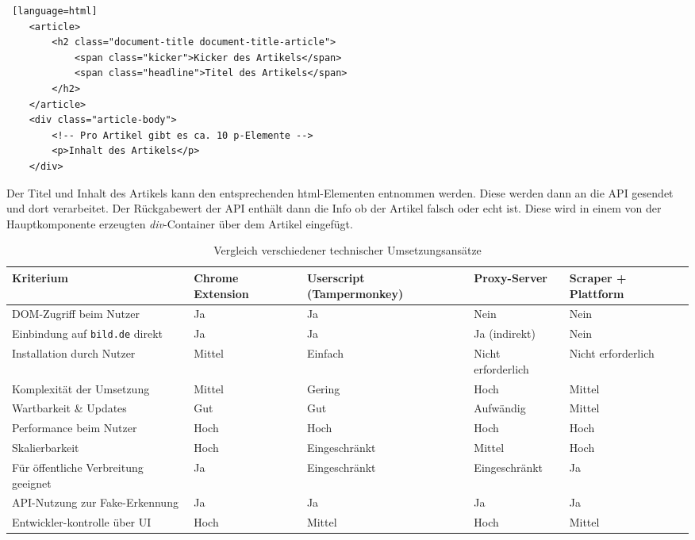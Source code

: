 \begin{lstlisting} [language=html]
    <article>
        <h2 class="document-title document-title-article">
            <span class="kicker">Kicker des Artikels</span>
            <span class="headline">Titel des Artikels</span>
        </h2>
    </article>
    <div class="article-body">
        <!-- Pro Artikel gibt es ca. 10 p-Elemente -->
        <p>Inhalt des Artikels</p>
    </div>
\end{lstlisting}

Der Titel und Inhalt des Artikels kann den entsprechenden html-Elementen entnommen werden.
Diese werden dann an die API gesendet und dort verarbeitet. 
Der Rückgabewert der API enthält dann die Info ob der Artikel falsch oder echt ist.
Diese wird in einem von der Hauptkomponente erzeugten \textit{div}-Container über dem Artikel eingefügt.

\begin{table}[ht]
    \centering
    \renewcommand{\arraystretch}{1.3}
    \begin{tabular}{|p{2.5cm}|p{2.5cm}|p{2.5cm}|p{2.5cm}|p{2.5cm}|}
        \hline
        \textbf{Kriterium} & \textbf{Chrome Extension} & \textbf{Userscript (Tampermonkey)} & \textbf{Proxy-Server} & \textbf{Scraper + Plattform} \\
        \hline
        DOM-Zugriff beim Nutzer & Ja & Ja & Nein & Nein \\
        \hline
        Einbindung auf \texttt{bild.de} direkt & Ja & Ja & Ja (indirekt) & Nein \\
        \hline
        Installation durch Nutzer & Mittel & Einfach & Nicht erforderlich & Nicht erforderlich\\
        \hline
        Komplexität der Umsetzung & Mittel & Gering & Hoch & Mittel \\
        \hline
        Wartbarkeit \& Updates & Gut & Gut & Aufwändig & Mittel \\
        \hline
        Performance beim Nutzer & Hoch & Hoch & Hoch & Hoch \\
        \hline
        Skalierbarkeit & Hoch & Eingeschränkt & Mittel & Hoch \\
        \hline
        Für öffentliche Verbreitung geeignet & Ja & Eingeschränkt & Eingeschränkt & Ja \\
        \hline
        API-Nutzung zur Fake-Erkennung & Ja & Ja & Ja & Ja \\
        \hline
        Entwickler-kontrolle über UI & Hoch & Mittel & Hoch & Mittel \\
        \hline
    \end{tabular}
    \caption{Vergleich verschiedener technischer Umsetzungsansätze}
    \label{table:technischeAnsaetze}
\end{table}


